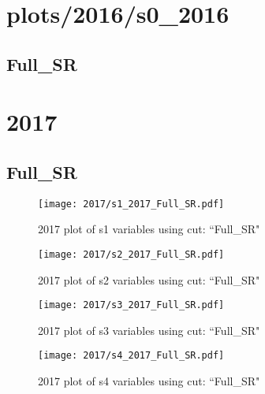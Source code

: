 \documentclass{article}
\begin{document}
    \section*{plots/2016/s0_2016}
      \subsection*{Full\_SR}
    \section*{2017}
      \subsection*{Full\_SR}
                        \begin{figure}[H]
                            \centering
                            \caption{2017 plot of s1 variables using cut: ``Full\_SR"}
                            \texttt{[image: 2017/s1\_2017\_Full\_SR.pdf]}
                        \end{figure}    
                        \begin{figure}[H]
                            \centering
                            \caption{2017 plot of s2 variables using cut: ``Full\_SR"}
                            \texttt{[image: 2017/s2\_2017\_Full\_SR.pdf]}
                        \end{figure}    
                        \begin{figure}[H]
                            \centering
                            \caption{2017 plot of s3 variables using cut: ``Full\_SR"}
                            \texttt{[image: 2017/s3\_2017\_Full\_SR.pdf]}
                        \end{figure}    
                        \begin{figure}[H]
                            \centering
                            \caption{2017 plot of s4 variables using cut: ``Full\_SR"}
                            \texttt{[image: 2017/s4\_2017\_Full\_SR.pdf]}
                        \end{figure}    
\end{document}
